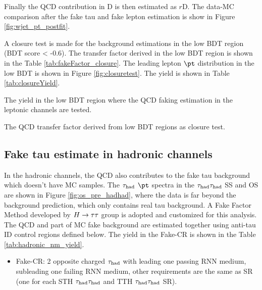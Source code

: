 Finally the QCD contribution in D is then estimated as $r$D.
The data-MC comparison after the fake tau and fake lepton estimation is show in Figure \ref{fig:wjet_pt_postfit}.


A closure test is made for the background estimations in the low BDT region (BDT score < -0.6). The transfer factor derived in the low BDT region is shown in the Table \ref{tab:fakeFactor_closure}. The leading lepton $\pt$ distribution in the low BDT is shown in Figure \ref{fig:closuretest}. The yield is shown in Table \ref{tab:closureYield}.




\begin{table}
\caption{The yield in the low BDT region where the QCD faking estimation in the leptonic channels are tested.}
\label{tab:closureYield}

\end{table}


\begin{table}
\caption{The QCD transfer factor derived from low BDT regions as closure test.}
\label{tab:fakeFactor_closure}

\end{table}

\newpage
\subsection{Fake tau estimate in hadronic channels}
\label{sec:ss_method}

In the hadronic channels, the QCD also contributes to the fake tau background which doesn't have MC samples. The $\tau_\text{had}$ $\pt$ spectra in the $\tau_\text{had}{}\tau_\text{had}$ SS and OS are shown in Figure \ref{fig:os_pre_hadhad}, where the data is far beyond the background prediction, which only contains real tau background. A Fake Factor Method developed by $H \rightarrow \tau\tau$ group \cite{Htautau-note} is adopted and customized for this analysis. The QCD and part of MC fake background are estimated together using anti-tau ID control regions defined below. The yield in the Fake-CR is shown in the Table \ref{tab:hadronic_nm_yield}. 

\begin{itemize}
\item{Fake-CR: 2 opposite charged $\tau_\text{had}$ with leading one passing RNN medium, subleading one failing RNN medium, other requirements are the same as SR (one for each STH $\tau_\text{had}{}\tau_\text{had}$ and TTH $\tau_\text{had}{}\tau_\text{had}$ SR).}
\end{itemize}

